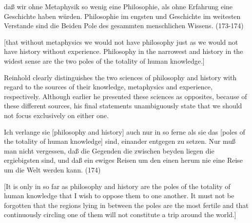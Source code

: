 da\ss{} wir ohne Metaphysik so wenig eine Philosophie, als ohne Erfahrung eine Geschichte haben w\"{u}rden. Philosophie im engsten und Geschichte im weitesten Verstande sind die Beiden Pole des gesammten menschlichen Wissens. (173{-}174) 

[that without metaphysics we would not have philosophy just as we would not have history without experience. Philosophy in the narrowest and history in the widest sense are the two poles of the totality of human knowledge.]

Reinhold clearly distinguishes the two sciences of philosophy and history with regard to the sources of their knowledge, metaphysics and experience, respectively. Although earlier he presented these sciences as opposites, because of these different sources, his final statements unambiguously state that we should not focus exclusively on either one. 

Ich verlange sie [philosophy and history] auch nur in so ferne als sie das [poles of the totality of human knowledge] sind, einander entgegen zu setzen. Nur mu\ss{} man nicht vergessen, da\ss{} die Gegenden die zwischen beyden liegen die ergiebigsten sind, und da\ss{} ein ewiges Reisen um den einen herum nie eine Reise um die Welt werden kann. (174)

[It is only in so far as philosophy and history are the poles of the totality of human knowledge that I wish to oppose them to one another. It must not be forgotten that the regions lying in between the poles are the most fertile and that continuously circling one of them will not constitute a trip around the world.]

